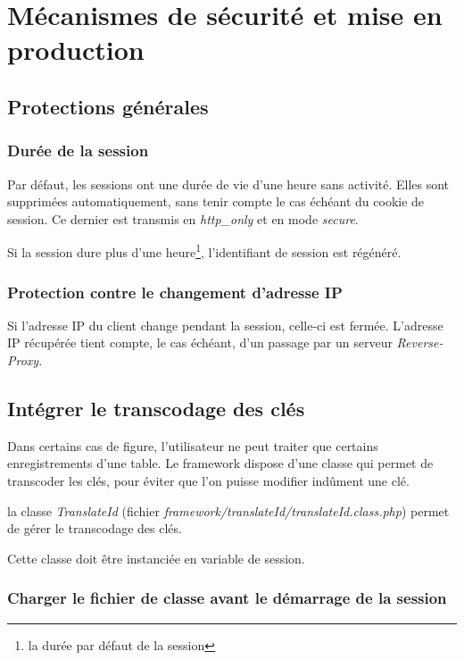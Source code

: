\chapter{Mécanismes de sécurité et mise en production}

\section{Protections générales}
\subsection{Durée de la session}
Par défaut, les sessions ont une durée de vie d'une heure sans activité. Elles sont supprimées automatiquement, sans tenir compte le cas échéant du cookie de session. Ce dernier est transmis en \textit{http\_only} et en mode \textit{secure}.

Si la session dure plus d'une heure\footnote{la durée par défaut de la session}, l'identifiant de session est régénéré.

\subsection{Protection contre le changement d'adresse IP}

Si l'adresse IP du client change pendant la session, celle-ci est fermée. L'adresse IP récupérée tient compte, le cas échéant, d'un passage par un serveur \textit{Reverse-Proxy}.

\section{Intégrer le transcodage des clés}

Dans certains cas de figure, l'utilisateur ne peut traiter que certains enregistrements d'une table. Le framework dispose d'une classe qui permet de transcoder les clés, pour éviter que l'on puisse modifier indûment une clé.

la classe \textit{TranslateId} (fichier \textit{framework/translateId/translateId.class.php}) permet de gérer le transcodage des clés.

Cette classe doit être instanciée en variable de session.

\subsection{Charger le fichier de classe avant le démarrage de la session}

